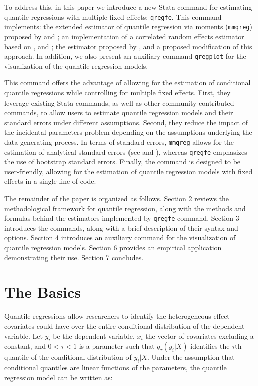 \documentclass[bib]{statapress}
\begin{document}
To address this, in this paper we introduce a new Stata command for
estimating quantile regressions with multiple fixed effects:
\texttt{qregfe}. This command implements: the extended estimator of
quantile regression via moments (\texttt{mmqreg}) proposed by
\citet{mss2019} and \citet{riosavila2024}; an implementation of a
correlated random effects estimator based on \citet{abrevaya2008},
\citet{wooldridge2019} and \citet[Ch12.10.3]{wooldridge2010}; the
estimator proposed by \citet{canay2011}, and a proposed modification of
this approach. In addition, we also present an auxiliary command
\texttt{qregplot} for the visualization of the quantile regression
models.

This command offers the advantage of allowing for the estimation of
conditional quantile regressions while controlling for multiple fixed
effects. First, they leverage existing Stata commands, as well as other
community-contributed commands, to allow users to estimate quantile
regression models and their standard errors under different assumptions.
Second, they reduce the impact of the incidental parameters problem
depending on the assumptions underlying the data generating process. In
terms of standard errors, \texttt{mmqreg} allows for the estimation of
analytical standard errors (see \citet{mss2019} and
\citet{riosavila2024}), whereas \texttt{qregfe} emphasizes the use of
bootstrap standard errors. Finally, the command is designed to be
user-friendly, allowing for the estimation of quantile regression models
with fixed effects in a single line of code.

The remainder of the paper is organized as follows. Section 2 reviews
the methodological framework for quantile regression, along with the
methods and formulas behind the estimators implemented by
\texttt{qregfe} command. Section 3 introduces the commands, along with a
brief description of their syntax and options. Section 4 introduces an
auxiliary command for the visualization of quantile regression models.
Section 6 provides an empirical application demonstrating their use.
Section 7 concludes.

\section{The Basics}\label{sec-basics}

Quantile regressions allow researchers to identify the heterogeneous
effect covariates could have over the entire conditional distribution of
the dependent variable. Let \(y_i\) be the dependent variable, \(x_i\)
the vector of covariates excluding a constant, and \(0<\tau<1\) is a
parameter such that \(q_\tau(y_i|X)\) identifies the \(\tau\)th quantile
of the conditional distribution of \(y_i|X\). Under the assumption that
conditional quantiles are linear functions of the parameters, the
quantile regression model can be written as:
\end{document}

